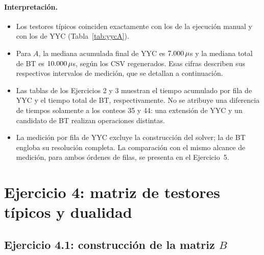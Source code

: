 \documentclass[11pt, a4paper]{article}
\theoremstyle{definition}
\theoremstyle{plain}
\begin{document}
\paragraph{Interpretación.}
\begin{itemize}[nosep]
\item Los testores típicos coinciden exactamente con los de la ejecución manual
  y con los de YYC (Tabla~\ref{tab:yycA}).
\item Para $A$, la mediana acumulada final de YYC es
  $7.000\,\mu$s y la mediana total de BT es $10.000\,\mu$s,
  según los CSV regenerados. Esas cifras describen sus respectivos intervalos
  de medición, que se detallan a continuación.
\item Las tablas de los Ejercicios 2 y 3 muestran el tiempo acumulado por
  fila de YYC y el tiempo total de BT, respectivamente. No se atribuye una
  diferencia de tiempos solamente a los conteos 35 y 44: una extensión de YYC
  y un candidato de BT realizan operaciones distintas.
\item La medición por fila de YYC excluye la construcción del solver; la de BT
  engloba su resolución completa. La comparación con el mismo alcance de
  medición, para ambos órdenes de filas, se presenta en el Ejercicio~5.
\end{itemize}


\section{Ejercicio 4: matriz de testores típicos y dualidad}\label{sec:ejercicio4}

\subsection{Ejercicio 4.1: construcción de la matriz $B$}
\end{document}
